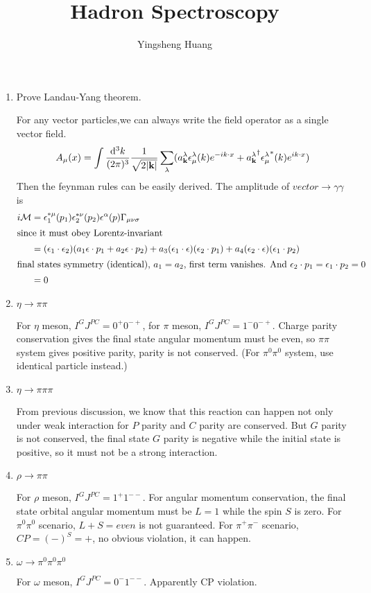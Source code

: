 \documentclass{article}
\title{Hadron Spectroscopy}
\author{Yingsheng Huang}
\newcommand{\vbk}{\vb{k}}
\newcommand{\g}{\gamma}
\renewcommand{\a}{\alpha}
\newcommand{\la}{\lambda}
\newcommand{\s}{\sigma}
\begin{document}
\maketitle

\begin{enumerate}
  \item Prove Landau-Yang theorem.

	For any vector particles,we can always write the field operator as a single vector field.
  $$A_{\mu}(x)=\int\frac{\dd^3k}{(2\pi)^3}\frac{1}{\sqrt{2\abs{\vb{k}}}}\sum_{\la}(a^{\la}_{\vbk}\epsilon^{\la}_{\mu}(k)e^{-ik\cdot x}+{a^{\la}_{\vbk}}^{\dagger}{\epsilon^{\la}_{\mu}}^*(k)e^{ik\cdot x})$$
  Then the feynman rules can be easily derived. The amplitude of $vector\rightarrow \g\g$ is
  \begin{align*}
    i\mathcal{M}&=\epsilon_1^{*\mu}(p_1)\epsilon_2^{*\nu}(p_2)\epsilon^{\a}(p)\Gamma_{\mu\nu\s}\\
    \intertext{since it must obey Lorentz-invariant}
    &=(\epsilon_1\cdot\epsilon_2)(a_1\epsilon\cdot p_1+a_2\epsilon\cdot p_2)+a_3(\epsilon_1\cdot \epsilon)(\epsilon_2\cdot p_1)+a_4(\epsilon_2\cdot \epsilon)(\epsilon_1\cdot p_2)\\
    \intertext{final states symmetry (identical), $a_1=a_2$, first term vanishes. And $\epsilon_2\cdot p_1=\epsilon_1\cdot p_2=0$}
    &=0
  \end{align*} 
\item $\eta\rightarrow\pi\pi$

  For $\eta$ meson, $I^GJ^{PC}=0^+0^{-+}$, for $\pi$ meson, $I^GJ^{PC}=1^-0^{-+}$. Charge parity conservation gives the final state angular momentum must be even, so $\pi\pi$ system gives positive parity, parity is not conserved. (For $\pi^0\pi^0$ system, use identical particle instead.)

  \item $\eta\rightarrow\pi\pi\pi$

	From previous discussion, we know that this reaction can happen not only under weak interaction for $P$ parity and $C$ parity are conserved. But $G$ parity is not conserved, the final state $G$ parity is negative while the initial state is positive, so it must not be a strong interaction.

	\item $\rho\rightarrow\pi\pi$

	  For $\rho$ meson, $I^GJ^{PC}=1^+1^{--}$. For angular momentum conservation, the final state orbital angular momentum must be $L=1$ while the spin $S$ is zero. For $\pi^0\pi^0$ scenario, $L+S=even$ is not guaranteed. For $\pi^+\pi^-$ scenario, $CP=(-)^S=+$, no obvious violation, it can happen.

	  \item $\omega\rightarrow\pi^0\pi^0\pi^0$

		For $\omega$ meson, $I^GJ^{PC}=0^-1^{--}$. Apparently CP violation.
\end{enumerate}
\end{document}
